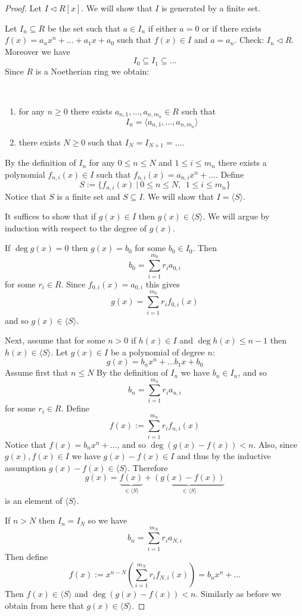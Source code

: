 \documentclass[12pt, letterpaper, oneside]{article}
\theoremstyle{plain}
\theoremstyle{definition}
\newcommand{\subgp}[1]{\langle#1\rangle}
\newcommand{\benu}{\begin{enumerate}}
\newcommand{\eenu}{\end{enumerate}}
\newcommand{\vs}{\vskip 5mm}
\begin{document}
\vs


\begin{proof}
Let $I\lhd R[x]$. We will show that $I$ is generated by a finite set. 

Let $I_{n}\subseteq R$  be the set such that $a\in I_{n}$ if  either 
$a=0$ or if there exists $f(x) = a_{n}x^{n} + \dots + a_{1}x+a_{0}$ such that $f(x)\in I$ and 
$a=a_{n}$.  Check: $I_{n}\lhd R$. Moreover we have 
$$I_{0}\subseteq I_{1}\subseteq \dots$$
Since $R$ is a Noetherian ring we obtain:

\vskip -13mm

\ 
\benu
\item  for any $n\geq 0$ there exists $a_{n,1}, \dots, a_{n, m_{n}}\in R$ such that
$$I_{n} = \subgp{a_{n,1}, \dots, a_{n, m_{n}}}$$
\item there exists $N\geq 0$ such that $I_{N} = I_{N+1} = \dots$.
\eenu

By the definition of $I_{n}$ for any $0\leq n\leq N$ and $1\leq i \leq m_{n}$ there exists 
a polynomial $f_{n, i}(x)\in I$ such that $f_{n, i}(x) = a_{n, i}x^{n} + \dots$.  Define 
$$S:= \{ f_{n, i}(x) \ | \ 0\leq n \leq N, \ \ 1\leq i \leq m_{n} \}$$
Notice that $S$ is a finite set and $S\subseteq I$. 
We will show that $I = \subgp{S}$. 

It suffices to show that  if $g(x)\in I$ then $g(x)\in \subgp{S}$. 
We will argue by  induction with respect to the degree of $g(x)$. 


If $\deg g(x) = 0$ then $g(x) = b_{0}$ for some $b_{0}\in I_{0}$. Then 
$$b_{0} = \sum_{i=1}^{m_{0}} r_{i}a_{0, i}$$
for some $r_{i}\in R$. Since $f_{0, i}(x) = a_{0, i}$ this gives 
$$g(x) = \sum_{i=1}^{m_{0}} r_{i}f_{0, i}(x) $$   
and so $g(x)\in \subgp{S}$. 


Next, assume that for some $n > 0$ if $h(x) \in I$ and $\deg h(x) \leq n-1$ then $h(x)\in \subgp{S}$. 
Let $g(x)\in I$ be a polynomial of degree  $n$:
$$g(x) = b_{n}x^{n} + \dots b_{1}x + b_{0}$$
Assume first that $n\leq N$
By the definition of $I_{n}$ we have $b_{n}\in I_{n}$, and so 
$$b_{n} = \sum_{i=1}^{m_{n}} r_{i}a_{n, i}$$
for some $r_{i}\in R$. 
Define
$$f(x) := \sum_{i=1}^{m_{n}} r_{i}f_{n, i}(x)$$
Notice that  $f(x) = b_{n}x^{n} + \dots$, and so $\deg (g(x)-f(x)) < n$. Also, since 
$g(x), f(x) \in I$ we have $g(x)-f(x)\in I$ and thus by the inductive assumption $g(x)-f(x)\in \subgp{S}$. 
Therefore 
$$g(x) = \underbrace{f(x)}_{\in \subgp{S}} + \underbrace{(g(x)-f(x))}_{\in \subgp{S}}$$
is an element of $\subgp{S}$. 


If $n > N$ then $I_{n} = I_{N}$ so we have 
$$b_{n} = \sum_{i=1}^{m_{N}} r_{i}a_{N, i}$$
Then define 
$$f(x) := x^{n-N}\left(\sum_{i=1}^{m_{N}} r_{i}f_{N, i}(x)\right) = b_{n}x^{n} + \dots$$
Then $f(x)\in \subgp{S}$ and $\deg (g(x) - f(x)) < n $. Similarly as before we obtain from 
here that $g(x)\in \subgp{S}$. 



\end{proof}
\end{document}

